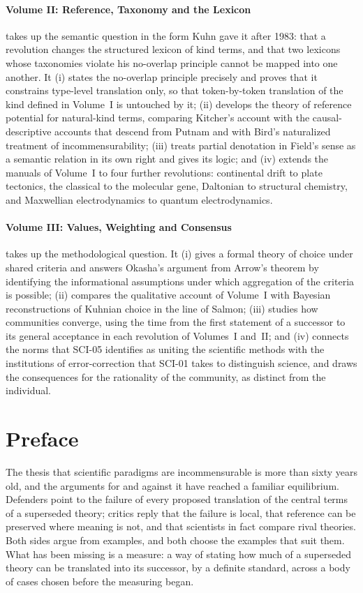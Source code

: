 \documentclass{situationist-preprint}
\begin{document}
\paragraph{Volume II: Reference, Taxonomy and the Lexicon} takes up the semantic question in the form Kuhn gave it after 1983: that a revolution changes the structured lexicon of kind terms, and that two lexicons whose taxonomies violate his no-overlap principle cannot be mapped into one another. It (i) states the no-overlap principle precisely and proves that it constrains type-level translation only, so that token-by-token translation of the kind defined in Volume~I is untouched by it; (ii) develops the theory of reference potential for natural-kind terms, comparing Kitcher's account with the causal-descriptive accounts that descend from Putnam and with Bird's naturalized treatment of incommensurability; (iii) treats partial denotation in Field's sense as a semantic relation in its own right and gives its logic; and (iv) extends the manuals of Volume~I to four further revolutions: continental drift to plate tectonics, the classical to the molecular gene, Daltonian to structural chemistry, and Maxwellian electrodynamics to quantum electrodynamics.

\paragraph{Volume III: Values, Weighting and Consensus} takes up the methodological question. It (i) gives a formal theory of choice under shared criteria and answers Okasha's argument from Arrow's theorem by identifying the informational assumptions under which aggregation of the criteria is possible; (ii) compares the qualitative account of Volume~I with Bayesian reconstructions of Kuhnian choice in the line of Salmon; (iii) studies how communities converge, using the time from the first statement of a successor to its general acceptance in each revolution of Volumes~I and~II; and (iv) connects the norms that SCI-05 identifies as uniting the scientific methods with the institutions of error-correction that SCI-01 takes to distinguish science, and draws the consequences for the rationality of the community, as distinct from the individual.

\section*{Preface}

The thesis that scientific paradigms are incommensurable is more than sixty years old, and the arguments for and against it have reached a familiar equilibrium. Defenders point to the failure of every proposed translation of the central terms of a superseded theory; critics reply that the failure is local, that reference can be preserved where meaning is not, and that scientists in fact compare rival theories. Both sides argue from examples, and both choose the examples that suit them. What has been missing is a measure: a way of stating how much of a superseded theory can be translated into its successor, by a definite standard, across a body of cases chosen before the measuring began.
\end{document}
